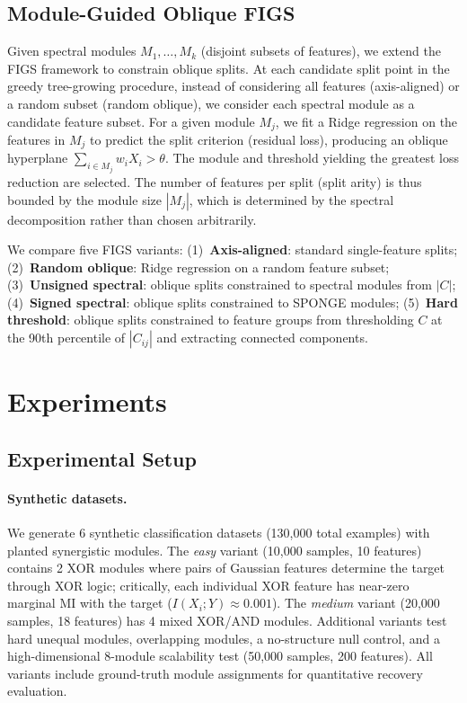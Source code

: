 \documentclass[11pt,letterpaper]{article}
\begin{document}
\subsection{Module-Guided Oblique FIGS}
\label{sec:module_figs}

Given spectral modules $M_1, \ldots, M_k$ (disjoint subsets of features), we extend the FIGS \citep{Tan2025} framework to constrain oblique splits. At each candidate split point in the greedy tree-growing procedure, instead of considering all features (axis-aligned) or a random subset (random oblique), we consider each spectral module as a candidate feature subset. For a given module $M_j$, we fit a Ridge regression on the features in $M_j$ to predict the split criterion (residual loss), producing an oblique hyperplane $\sum_{i \in M_j} w_i X_i > \theta$. The module and threshold yielding the greatest loss reduction are selected. The number of features per split (split arity) is thus bounded by the module size $|M_j|$, which is determined by the spectral decomposition rather than chosen arbitrarily.

We compare five FIGS variants: (1)~\textbf{Axis-aligned}: standard single-feature splits; (2)~\textbf{Random oblique}: Ridge regression on a random feature subset; (3)~\textbf{Unsigned spectral}: oblique splits constrained to spectral modules from $|C|$; (4)~\textbf{Signed spectral}: oblique splits constrained to SPONGE modules; (5)~\textbf{Hard threshold}: oblique splits constrained to feature groups from thresholding $C$ at the 90th percentile of $|C_{ij}|$ and extracting connected components.

\section{Experiments}
\label{sec:experiments}

\subsection{Experimental Setup}
\label{sec:setup}

\paragraph{Synthetic datasets.} We generate 6 synthetic classification datasets (130,000 total examples) with planted synergistic modules. The \emph{easy} variant (10,000 samples, 10 features) contains 2 XOR modules where pairs of Gaussian features determine the target through XOR logic; critically, each individual XOR feature has near-zero marginal MI with the target ($I(X_i; Y) \approx 0.001$). The \emph{medium} variant (20,000 samples, 18 features) has 4 mixed XOR/AND modules. Additional variants test hard unequal modules, overlapping modules, a no-structure null control, and a high-dimensional 8-module scalability test (50,000 samples, 200 features). All variants include ground-truth module assignments for quantitative recovery evaluation.
\end{document}
